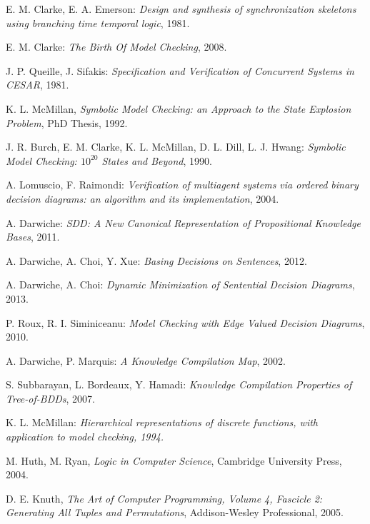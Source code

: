 \documentclass[11pt]{report}
\begin{document}
\begin{thebibliography}{9}

 E. M. Clarke, E. A. Emerson: \textit{Design and synthesis of synchronization skeletons using branching time temporal logic}, 1981.

 E. M. Clarke: \textit{The Birth Of Model Checking}, 2008.

 J. P. Queille, J. Sifakis: \textit{Specification and Verification of Concurrent Systems in CESAR}, 1981.

 K. L. McMillan, \textit{Symbolic Model Checking: an Approach to the State Explosion Problem}, PhD Thesis, 1992. 

 J. R. Burch, E. M. Clarke, K. L. McMillan, D. L. Dill, L. J. Hwang: \textit{Symbolic Model Checking: $\textit{10}^{\textit{20}}$ States and Beyond}, 1990.

 A. Lomuscio, F. Raimondi: \textit{Verification of multiagent systems via ordered binary decision diagrams: an algorithm and its implementation}, 2004. 

A. Darwiche:\emph{ SDD: A New Canonical Representation of Propositional Knowledge Bases}, 2011.

A. Darwiche, A. Choi, Y. Xue: \emph{Basing Decisions on Sentences}, 2012.

A. Darwiche, A. Choi: \textit{Dynamic Minimization of Sentential Decision Diagrams}, 2013.

 P. Roux, R. I. Siminiceanu: \textit{Model Checking with Edge Valued Decision Diagrams}, 2010. 

  A. Darwiche, P. Marquis:
  \emph{A Knowledge Compilation Map}, 2002.

S. Subbarayan, L. Bordeaux, Y. Hamadi:\textit{
Knowledge Compilation Properties of Tree-of-BDDs}, 2007.

K. L. McMillan:\textit{ Hierarchical representations of discrete functions, with application to model checking, 1994.
}

 M. Huth, M. Ryan, 
\emph{Logic in Computer Science},
Cambridge University Press, 2004.

 D. E. Knuth, \textit{The Art of Computer Programming, Volume
4, Fascicle 2: Generating All Tuples and Permutations}, Addison-Wesley Professional, 2005.


\end{thebibliography}
\end{document}
